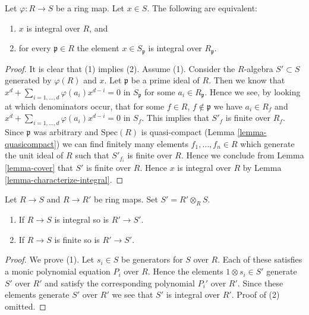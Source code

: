 \begin{lemma}
\label{lemma-integral-closure-stalks}
Let $\varphi : R \to S$ be a ring map.
Let $x \in S$. The following are equivalent:
\begin{enumerate}
\item $x$ is integral over $R$, and
\item for every $\mathfrak p \in R$ the element
$x \in S_{\mathfrak p}$ is integral over $R_{\mathfrak p}$.
\end{enumerate}
\end{lemma}

\begin{proof}
It is clear that (1) implies (2). Assume (1). Consider the $R$-algebra
$S' \subset S$ generated by $\varphi(R)$ and $x$. Let $\mathfrak p$ be
a prime ideal of $R$. Then we know that
$x^d + \sum_{i = 1, \ldots, d} \varphi(a_i) x^{d - i} = 0$
in $S_{\mathfrak p}$ for some $a_i \in R_{\mathfrak p}$. Hence we see,
by looking at which denominators occur, that
for some $f \in R$, $f \not \in \mathfrak p$ we have
$a_i \in R_f$ and
$x^d + \sum_{i = 1, \ldots, d} \varphi(a_i) x^{d - i} = 0$
in $S_f$. This implies that $S'_f$ is finite over $R_f$.
Since $\mathfrak p$ was arbitrary and $\text{Spec}(R)$ is quasi-compact
(Lemma \ref{lemma-quasicompact}) we can find finitely many elements
$f_1, \ldots, f_n \in R$
which generate the unit ideal of $R$ such that $S'_{f_i}$ is finite
over $R$. Hence we conclude from Lemma \ref{lemma-cover} that
$S'$ is finite over $R$. Hence $x$ is integral over $R$ by
Lemma \ref{lemma-characterize-integral}.
\end{proof}

\begin{lemma}
\label{lemma-base-change-integral}
Let $R \to S$ and $R \to R'$ be ring maps.
Set $S' = R' \otimes_R S$.
\begin{enumerate}
\item If $R \to S$ is integral so is $R' \to S'$.
\item If $R \to S$ is finite so is $R' \to S'$.
\end{enumerate}
\end{lemma}

\begin{proof}
We prove (1).
Let $s_i \in S$ be generators for $S$ over $R$.
Each of these satisfies a monic polynomial equation $P_i$
over $R$. Hence the elements $1 \otimes s_i \in S'$ generate
$S'$ over $R'$ and satisfy the corresponding polynomial
$P_i'$ over $R'$. Since these elements generate $S'$ over $R'$
we see that $S'$ is integral over $R'$.
Proof of (2) omitted.
\end{proof}

